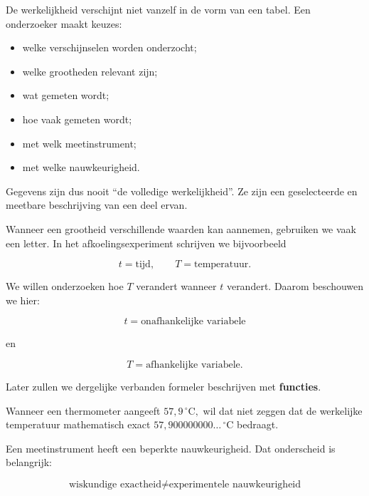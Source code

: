 \documentclass{ximera}
\begin{document}

De werkelijkheid verschijnt niet vanzelf in de vorm van een tabel. Een onderzoeker maakt keuzes:

\begin{itemize}
  \item welke verschijnselen worden onderzocht;
  \item welke grootheden relevant zijn;
  \item wat gemeten wordt;
  \item hoe vaak gemeten wordt;
  \item met welk meetinstrument;
  \item met welke nauwkeurigheid.
\end{itemize}

Gegevens zijn dus nooit ``de volledige werkelijkheid''. Ze zijn een geselecteerde en meetbare beschrijving van een deel ervan.





Wanneer een grootheid verschillende waarden kan aannemen, gebruiken we
vaak een letter. In het afkoelingsexperiment schrijven we bijvoorbeeld

\[
t=\text{tijd},
\qquad
T=\text{temperatuur}.
\]

We willen onderzoeken hoe $T$ verandert wanneer $t$ verandert. Daarom beschouwen we hier:

\[
\boxed{
t=\text{onafhankelijke variabele}
}
\]

en

\[
\boxed{
T=\text{afhankelijke variabele}.
}
\]

Later zullen we dergelijke verbanden formeler beschrijven met
\textbf{functies}.





Wanneer een thermometer aangeeft
\(
57{,}9\,^\circ\mathrm C,
\)
wil dat niet zeggen dat de werkelijke temperatuur mathematisch exact
\(
57{,}900000000\ldots\,^\circ\mathrm C
\) bedraagt.

Een meetinstrument heeft een beperkte nauwkeurigheid. Dat onderscheid is belangrijk:

\[
\boxed{
\text{wiskundige exactheid}
\neq
\text{experimentele nauwkeurigheid}
}
\]
\end{document}
